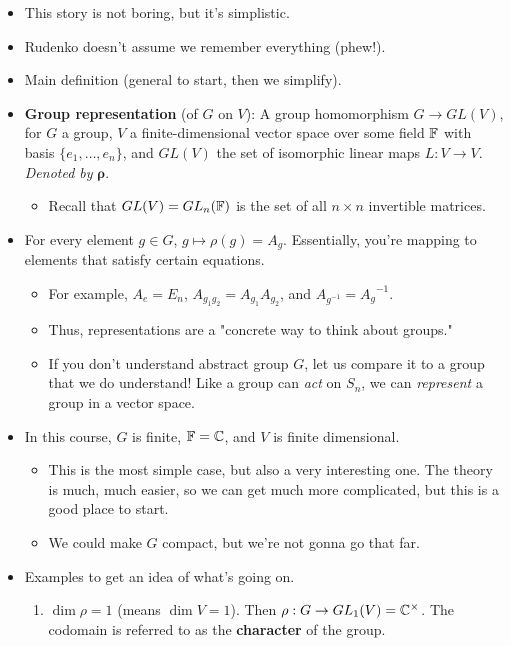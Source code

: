 \documentclass[../notes.tex]{subfiles}
\begin{document}
\begin{itemize}
\begin{itemize}
    \end{itemize}
    \item This story is not boring, but it's simplistic.
    \item Rudenko doesn't assume we remember everything (phew!).
    \item Main definition (general to start, then we simplify).
    \item \textbf{Group representation} (of $G$ on $V$): A group homomorphism $G\to GL(V)$, for $G$ a group, $V$ a finite-dimensional vector space over some field $\mathbb{F}$ with basis $\{e_1,\dots,e_n\}$, and $GL(V)$ the set of isomorphic linear maps $L:V\to V$. \emph{Denoted by} $\bm{\rho}$.
    \begin{itemize}
        \item Recall that $GL(V)=GL_n(\mathbb{F})$ is the set of all $n\times n$ invertible matrices.
    \end{itemize}
    \item For every element $g\in G$, $g\mapsto\rho(g)=A_g$. Essentially, you're mapping to elements that satisfy certain equations.
    \begin{itemize}
        \item For example, $A_e=E_n$, $A_{g_1g_2}=A_{g_1}A_{g_2}$, and $A_{g^{-1}}={A_g}^{-1}$.
        \item Thus, representations are a "concrete way to think about groups."
        \item If you don't understand abstract group $G$, let us compare it to a group that we do understand! Like a group can \emph{act} on $S_n$, we can \emph{represent} a group in a vector space.
    \end{itemize}
    \item In this course, $G$ is finite, $\mathbb{F}=\mathbb{C}$, and $V$ is finite dimensional.
    \begin{itemize}
        \item This is the most simple case, but also a very interesting one. The theory is much, much easier, so we can get much more complicated, but this is a good place to start.
        \item We could make $G$ compact, but we're not gonna go that far.
    \end{itemize}
    \item Examples to get an idea of what's going on.
    \begin{enumerate}
        \item $\dim\rho=1$ (means $\dim V=1$). Then $\rho:G\to GL_1(V)=\mathbb{C}^\times$. The codomain is referred to as the \textbf{character} of the group.

\end{enumerate}
\end{itemize}
\end{document}
